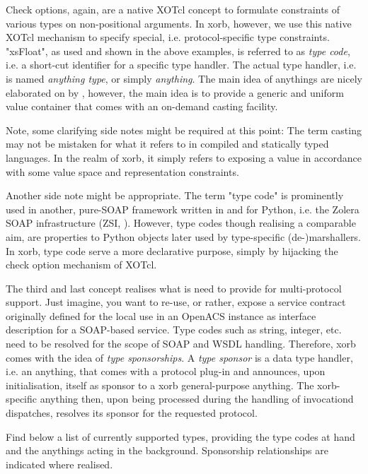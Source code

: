 Check options, again, are a native XOTcl concept to formulate constraints of various types on non-positional arguments. In xorb, however, we use this native XOTcl mechanism to specify special, i.e. protocol-specific type constraints. "xsFloat", as used and shown in the above examples, is referred to as \emph{type code}, i.e. a short-cut identifier for a specific type handler. The actual type handler, i.e.  is named \emph{anything type}, or simply \emph{anything}. The main idea of anythings are nicely elaborated on by \cite{sommerlad:1998,maetzel:1996}, however, the main idea is to provide a generic and uniform value container that comes with an on-demand casting facility. 
\begin{hints}
\item Note, some clarifying side notes might be required at this point: The term casting may not be mistaken for what it refers to in compiled and statically typed languages. In the realm of xorb, it simply refers to exposing a value in accordance with some value space and representation constraints.
\item Another side note might be appropriate. The term "type code" is prominently used in another, pure-SOAP framework written in and for Python, i.e. the Zolera SOAP infrastructure (ZSI, \cite{zsi:2007}). However, type codes though realising a comparable aim, are properties to Python objects later used by type-specific (de-)marshallers. In xorb, type code serve a more declarative purpose, simply by hijacking the check option mechanism of XOTcl.
\end{hints}
The third and last concept realises what is need to provide for multi-protocol support. Just imagine, you want to re-use, or rather, expose a service contract originally defined for the local use in an OpenACS instance as interface description for a SOAP-based service. Type codes such as string, integer, etc. need to be resolved for the scope of SOAP and WSDL handling. Therefore, xorb comes with the idea of \emph{type sponsorships}. A \emph{type sponsor} is a data type handler, i.e. an anything, that comes with a protocol plug-in and announces, upon initialisation, itself as sponsor to a xorb general-purpose anything. The xorb-specific anything then, upon being processed during the handling of invocationd dispatches, resolves its sponsor for the requested protocol. 

Find below a list of currently supported types, providing the type codes at hand and the anythings acting in the background. Sponsorship relationships are indicated where realised.

